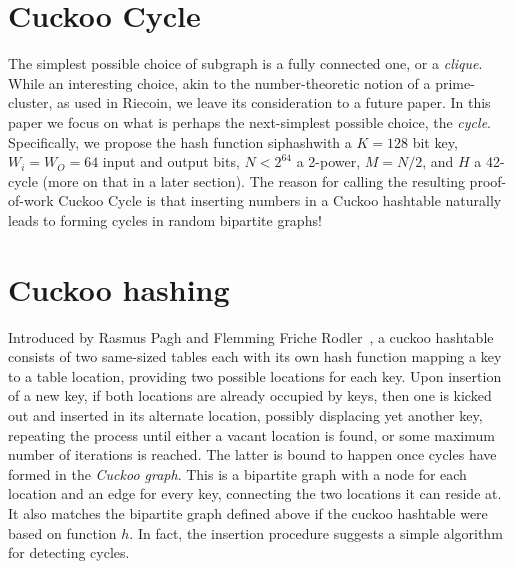 \documentclass[11pt, oneside]{article}
\newcommand{\hash}{{\rm siphash}}
\begin{document}
\section{Cuckoo Cycle}
The simplest possible choice of subgraph is a fully connected one, or a {\em clique}.
While an interesting choice, akin to the number-theoretic notion of a prime-cluster,
as used in Riecoin, we leave its consideration to a future paper.
In this paper we focus on what is perhaps the next-simplest possible choice, the {\em cycle}.
Specifically, we propose the hash function \hash with a $K=128$ bit key, $W_i = W_O = 64$ input
and output bits, $N<2^{64}$ a 2-power, $M=N/2$, and $H$ a 42-cycle (more on that in a later section).
The reason for calling the resulting proof-of-work Cuckoo Cycle is that
inserting numbers in a Cuckoo hashtable naturally leads to forming cycles
in random bipartite graphs!

\section{Cuckoo hashing}
Introduced by Rasmus Pagh and Flemming Friche
Rodler~\cite{Pagh04cuckoohashing}, a cuckoo hashtable consists of two
same-sized tables each with its own hash function mapping a key to a table
location, providing two possible locations for each key.
Upon insertion of a new key, if both locations are already occupied by keys,
then one is kicked out and inserted in its alternate location, possibly
displacing yet another key, repeating the process until either a vacant
location is found, or some maximum number of iterations is reached.
The latter is bound to happen once cycles have formed in the {\em Cuckoo graph}.
This is a bipartite graph with a node for each location and an
edge for every key, connecting the two locations it can reside at.
It also matches the bipartite graph defined above if the cuckoo hashtable
were based on function $h$.
In fact, the insertion procedure suggests a simple algorithm for detecting cycles.
\end{document}
